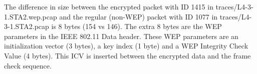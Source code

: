 The difference in size between the encrypted packet with ID 1415 in traces/L4-3-1.STA2.wep.pcap and the regular (non-WEP) packet with ID 1077 in traces/L4-3-1.STA2.pcap is 8 bytes (154 vs 146).
The extra 8 bytes are the WEP parameters in the IEEE 802.11 Data header. These WEP parameters are an initialization vector (3 bytes), a key index (1 byte) and a WEP Integrity Check Value (4 bytes). This ICV is inserted between the encrypted data and the frame check sequence.
